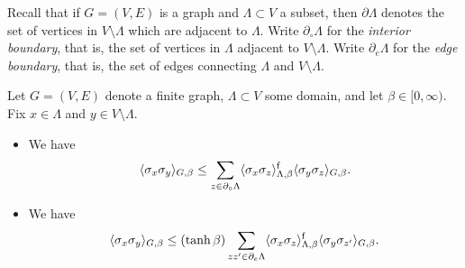 Recall that if $G=(V,E)$ is a graph and $\Lambda\subset V$
a subset, then $\partial\Lambda$ denotes the set of vertices in $V\setminus\Lambda$
which are adjacent to $\Lambda$.
Write $\partial_\circ\Lambda$ for the \emph{interior boundary},
that is, the set of vertices in $\Lambda$ adjacent to $V\setminus\Lambda$.
Write $\partial_e\Lambda$ for the \emph{edge boundary},
that is, the set of edges connecting $\Lambda$ and $V\setminus\Lambda$.

\begin{theorem}
    Let $G=(V,E)$ denote a finite graph,
    $\Lambda\subset V$ some domain,
    and let $\beta\in[0,\infty)$.
    Fix $x\in \Lambda$ and $y\in V\setminus\Lambda$.
    \begin{itemize}
        \item We have
        \[
            \langle\sigma_x\sigma_y\rangle_{G,\beta}
            \leq
            \sum_{z\in\partial_\circ\Lambda}
            \langle\sigma_x\sigma_z\rangle_{\Lambda,\beta}^{\operatorname{f}}
            \langle\sigma_y\sigma_z\rangle_{G,\beta}.
        \]
        \item We have
        \[
            \langle\sigma_x\sigma_y\rangle_{G,\beta}
            \leq
            (\tanh\beta)
            \sum_{zz'\in\partial_e\Lambda}
            \langle\sigma_x\sigma_z\rangle_{\Lambda,\beta}^{\operatorname{f}}
            \langle\sigma_y\sigma_{z'}\rangle_{G,\beta}.
        \]
    \end{itemize}
\end{theorem}

